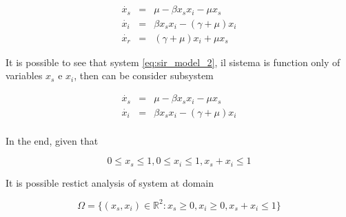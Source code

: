 \begin{equation}
\label{eq:sir_model_2}
    \begin{array}{ccc}
         \dot{x_s} &=&\mu - \beta x_sx_i - \mu x_s\\
         \dot{x_i} &=&\beta x_sx_i - (\gamma + \mu)x_i\\
         \dot{x_r} &=&(\gamma + \mu) x_i + \mu x_s
    \end{array}
\end{equation}

It is possible to see that system \ref{eq:sir_model_2}, il sistema is function only of variables $x_s$ e $x_i$, then can be consider subsystem

\begin{equation}
\label{eq:sir_model_3}
    \begin{array}{ccc}
         \dot{x_s} &=&\mu - \beta x_sx_i - \mu x_s\\
         \dot{x_i} &=&\beta x_sx_i - (\gamma + \mu)x_i\\
    \end{array}
\end{equation}

In the end, given that

\begin{equation}
    0 \leq x_s \leq 1, 0 \leq x_i \leq 1, x_s + x_i \leq 1
\end{equation}

It is possible restict analysis of system at domain

\begin{equation}
    \label{eq:roi}
    \Omega = \{ (x_s,x_i) \in \mathbb{R}^2 : x_s \geq 0, x_i \geq 0, x_s + x_i \leq 1 \}
\end{equation}